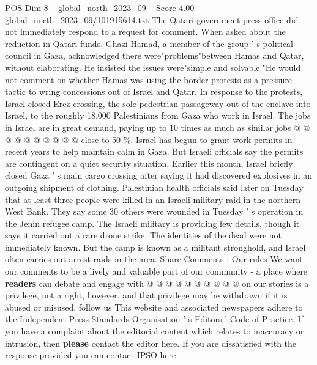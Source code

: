 \begin{textsample}{POS Dim 8 – global\_north\_2023\_09 – Score 4.00 – global\_north\_2023\_09/101915614.txt}
The Qatari government press office did not immediately respond to a request for comment.
When asked about the reduction in Qatari funds, Ghazi Hamad, a member of the group ' s political council in Gaza, acknowledged there were"problems"between Hamas and Qatar, without elaborating.
He insisted the issues were"simple and solvable."He would not comment on whether Hamas was using the border protests as a pressure tactic to wring concessions out of Israel and Qatar.
In response to the protests, Israel closed Erez crossing, the sole pedestrian passageway out of the enclave into Israel, to the roughly 18,000 Palestinians from Gaza who work in Israel.
The jobs in Israel are in great demand, paying up to 10 times as much as similar jobs @ @ @ @ @ @ @ @ @ @ close to 50 \%.
Israel has begun to grant work permits in recent years to help maintain calm in Gaza.
But Israeli officials say the permits are contingent on a quiet security situation.
Earlier this month, Israel briefly closed Gaza ' s main cargo crossing after saying it had discovered explosives in an outgoing shipment of clothing.
Palestinian health officials said later on Tuesday that at least three people were killed in an Israeli military raid in the northern West Bank.
They say some 30 others were wounded in Tuesday ' s operation in the Jenin refugee camp.
The Israeli military is providing few details, though it says it carried out a rare drone strike.
The identities of the dead were not immediately known.
But the camp is known as a militant stronghold, and Israel often carries out arrest raids in the area.
Share Comments : Our rules We want our comments to be a lively and valuable part of our community - a place where \textbf{readers} can debate and engage with @ @ @ @ @ @ @ @ @ @ on our stories is a privilege, not a right, however, and that privilege may be withdrawn if it is abused or misused. follow us This website and associated newspapers adhere to the Independent Press Standards Organisation ' s Editors ' Code of Practice.
If you have a complaint about the editorial content which relates to inaccuracy or intrusion, then \textbf{please} contact the editor here.
If you are dissatisfied with the response provided you can contact IPSO here

\end{textsample}
